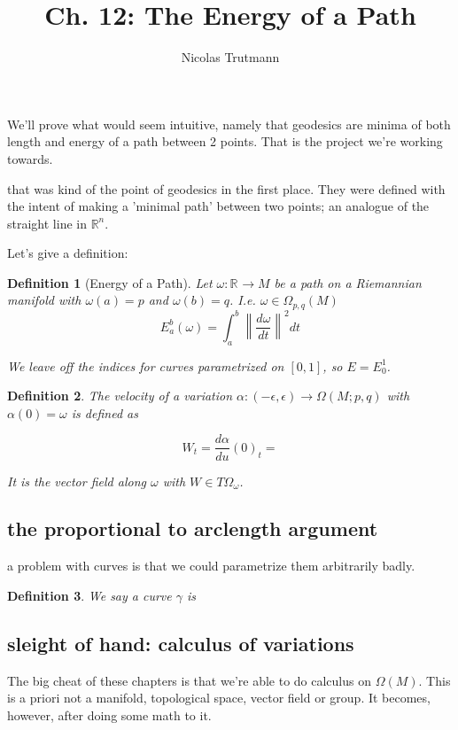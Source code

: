 \documentclass{article}
\title{Ch. 12: The Energy of a Path}
\author{Nicolas Trutmann}
\date{}
\newtheorem{def}{Definition}
\renewcommand{\Rn}[1][n]{\mathbb{R}^{#1}}
\newcommand{\Absbars}[1]{\left\lVert#1\right\rVert}
\newcommand{\rmfd}[1]{Riemannian manifold}
\begin{document}
\maketitle


We'll prove what would seem intuitive, namely that geodesics are minima of both length and energy of
a path between 2 points. That is the project we're working towards.

that was kind of the point of geodesics in the first place. They were defined with the intent of
making a 'minimal path' between two points; an analogue of the straight line in $\Rn$.

Let's give a definition:

\begin{def}[Energy of a Path]
Let $\omega : \Rn[] \rightarrow M $ be a path on a \rmfd, with $\omega(a) = p$ and $\omega(b) = q$.
I.e. $\omega \in \Omega_{p,q}(M)$
\[ E_a^b(\omega) = \int_a^b \Absbars{\frac{d\omega}{dt}}^2 dt \]

We leave off the indices for curves parametrized on $[0,1]$, so $E = E_0^1$.
\end{def}


\begin{def}
\label{def:vel_of_var}
    The velocity of a variation $\alpha: (-\epsilon, \epsilon) \rightarrow \Omega(M;p,q)$ with
    $\alpha(0) = \omega$ is defined as

    \[ W_t = \frac{d\alpha}{du}(0)_t = \]

    It is the vector field along $\omega$ with $W \in T\Omega_{\omega}$.
\end{def}


\subsection{the proportional to arclength argument}

a problem with curves is that we could parametrize them arbitrarily badly.

\begin{def}
    \label{def:reparametrization}
    We say a curve $\gamma$ is
\end{def}


\subsection{sleight of hand: calculus of variations}

\newcommand{\OM}{\Omega(M)}
The big cheat of these chapters is that we're able to do calculus on $\OM$.
This is a priori not a manifold, topological space, vector field or group.
It becomes, however, after doing some math to it.
\end{document}
